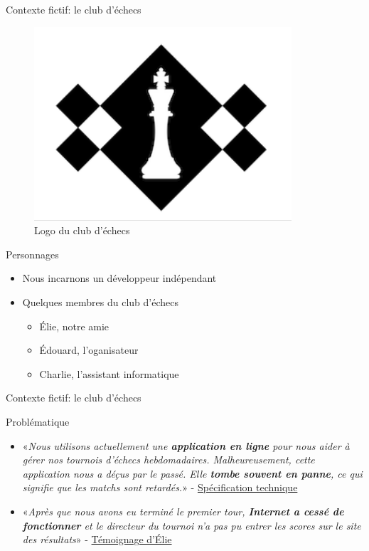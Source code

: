 \begin{frame}{Contexte fictif: le club d'échecs}
  \begin{figure}
    \begin{center}
      \includegraphics[scale=0.2]{img/logo_club.png}    
    \end{center}    
    \caption{Logo du club d'échecs}    
  \end{figure}
  
  \begin{block}{Personnages}
    \begin{itemize}
    \item Nous incarnons un développeur indépendant
    \item Quelques membres du club d'échecs
      \begin{itemize}
      \item Élie, notre amie
      \item Édouard, l'oganisateur
      \item Charlie, l'assistant informatique
      \end{itemize}
    \end{itemize}
  \end{block}
\end{frame}

\begin{frame}{Contexte fictif: le club d'échecs}
  \begin{block}{Problématique}
    \begin{itemize}
    \item «\textit{Nous utilisons actuellement une \textbf{application
        en ligne} pour nous aider à gérer nos tournois d'échecs
      hebdomadaires. Malheureusement, cette application nous a déçus par
      le passé. Elle \textbf{tombe souvent en panne}, ce qui signifie
      que les matchs sont retardés.}» - \underline{Spécification technique}

    \item «\textit{Après que nous avons eu terminé le premier tour,
      \textbf{Internet a cessé de fonctionner} et le directeur du tournoi n'a
      pas pu entrer les scores sur le site des résultats}» - \underline{Témoignage d'Élie}
    \end{itemize}
  \end{block}
\end{frame}

